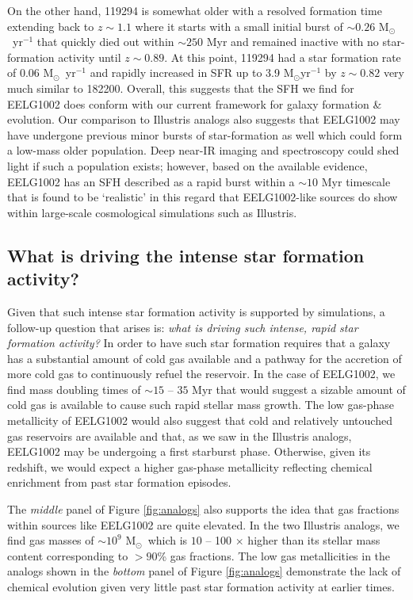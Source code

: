 \documentclass[twocolumn,tight,times,linenumbers]{aastex631}
\newcommand{\msol}{M$_\odot$}
\begin{document}
		On the other hand, 119294 is somewhat older with a resolved formation time extending back to $z \sim 1.1$ where it starts with a small initial burst of $\sim 0.26$ \msol~yr$^{-1}$ that quickly died out within $\sim 250$ Myr and remained inactive with no star-formation activity until $z \sim 0.89$. At this point, 119294 had a star formation rate of $0.06$ \msol~yr$^{-1}$ and rapidly increased in SFR up to 3.9 \msol yr$^{-1}$ by $z \sim 0.82$ very much similar to 182200. Overall, this suggests that the SFH we find for EELG1002 does conform with our current framework for galaxy formation \& evolution. Our comparison to Illustris analogs also suggests that EELG1002 may have undergone previous minor bursts of star-formation as well which could form a low-mass older population. Deep near-IR imaging and spectroscopy could shed light if such a population exists; however, based on the available evidence, EELG1002 has an SFH described as a rapid burst within a $\sim 10$ Myr timescale that is found to be `realistic' in this regard that EELG1002-like sources do show within large-scale cosmological simulations such as Illustris.
	
		
		\subsection{What is driving the intense star formation activity?}
		
		Given that such intense star formation activity is supported by simulations, a follow-up question that arises is: \textit{what is driving such intense, rapid star formation activity?} In order to have such star formation requires that a galaxy has a substantial amount of cold gas available and a pathway for the accretion of more cold gas to continuously refuel the reservoir. In the case of EELG1002, we find mass doubling times of $\sim 15$ -- $35$ Myr that would suggest a sizable amount of cold gas is available to cause such rapid stellar mass growth. The low gas-phase metallicity of EELG1002 would also suggest that cold and relatively untouched gas reservoirs are available and that, as we saw in the Illustris analogs, EELG1002 may be undergoing a first starburst phase. Otherwise, given its redshift, we would expect a higher gas-phase metallicity reflecting chemical enrichment from past star formation episodes. 
		
		The \textit{middle} panel of Figure \ref{fig:analogs} also supports the idea that gas fractions within sources like EELG1002 are quite elevated. In the two Illustris analogs, we find gas masses of $\sim 10^9$ \msol~which is $10$ -- 100 $\times$ higher than its stellar mass content corresponding to $>90$\% gas fractions. The low gas metallicities in the analogs shown in the \textit{bottom} panel of Figure \ref{fig:analogs} demonstrate the lack of chemical evolution given very little past star formation activity at earlier times. 
		
\end{document}
